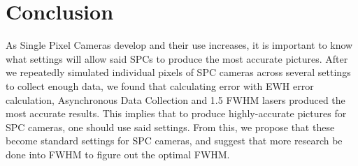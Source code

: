 \documentclass{article}
\begin{document}
\section*{Conclusion}
As Single Pixel Cameras develop and their use increases, it is important to know what settings will allow said SPCs to produce the most accurate pictures. After we repeatedly simulated  individual pixels of SPC cameras across several settings to collect enough data, we found that calculating error with EWH error calculation, Asynchronous Data Collection and 1.5 FWHM lasers produced the most accurate results. This implies that to produce highly-accurate pictures for SPC cameras, one should use said settings. From this, we propose that these become standard settings for SPC cameras, and suggest that more research be done into FWHM to figure out the optimal FWHM.

\printbibliography
\end{document}
